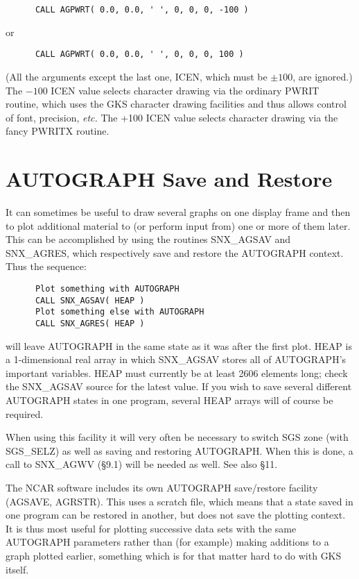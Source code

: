 \begin{verbatim}
      CALL AGPWRT( 0.0, 0.0, ' ', 0, 0, 0, -100 )
\end{verbatim}

or

\begin{verbatim}
      CALL AGPWRT( 0.0, 0.0, ' ', 0, 0, 0, 100 )
\end{verbatim}

(All the arguments except the last one, ICEN, which must be $\pm100$,
are ignored.)
The $-100$ ICEN value selects character drawing via
the ordinary PWRIT routine, which uses the GKS character drawing
facilities and thus allows control of font, precision, {\em etc.}
The +100 ICEN value selects character drawing via the fancy PWRITX routine.


\section {AUTOGRAPH Save and Restore}

It can sometimes be useful to draw several graphs on one
display frame and then to plot additional material to (or
perform input from) one or more of them later.
This can be accomplished by using the
routines SNX\_AGSAV and SNX\_AGRES, which respectively
save and restore the AUTOGRAPH context.  Thus the sequence:

\begin{verbatim}
      Plot something with AUTOGRAPH
      CALL SNX_AGSAV( HEAP )
      Plot something else with AUTOGRAPH
      CALL SNX_AGRES( HEAP )
\end{verbatim}

will leave AUTOGRAPH in the same state as it was after the first plot.
HEAP is a 1-dimensional real array in which SNX\_AGSAV stores
all of AUTOGRAPH's important variables.
HEAP must currently be at least 2606 elements long;
check the SNX\_AGSAV source for the latest value.
If you wish to save several different AUTOGRAPH states in
one program, several HEAP arrays will of course be required.

When using this facility it will very often be necessary to switch SGS zone
(with SGS\_SELZ) as well as saving and restoring AUTOGRAPH.
When this is done, a call to SNX\_AGWV (\S 9.1) will be needed as well.
See also \S 11.

The NCAR software includes its own AUTOGRAPH save/restore facility (AGSAVE,
AGRSTR).
This uses a scratch file, which means that a state saved in one program can be
restored in another, but does not save the plotting context.
It is thus most useful for plotting successive data sets with the same
AUTOGRAPH parameters rather than (for example) making additions to a graph
plotted earlier, something which is for that matter hard to do with GKS itself.



